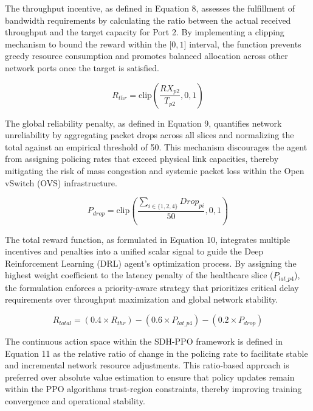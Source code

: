 The throughput incentive, as defined in Equation 8, assesses the fulfillment of bandwidth requirements by calculating the ratio between the actual received throughput and the target capacity for Port 2. By implementing a clipping mechanism to bound the reward within the \(\lbrack 0,1\rbrack\) interval, the function prevents greedy resource consumption and promotes balanced allocation across other network ports once the target is satisfied.

\begin{equation}\label{eq:8}
R_{thr} = \text{clip}\left( \frac{RX_{p2}}{T_{p2}},0,1 \right)
\end{equation}

The global reliability penalty, as defined in Equation 9, quantifies network unreliability by aggregating packet drops across all slices and normalizing the total against an empirical threshold of 50. This mechanism discourages the agent from assigning policing rates that exceed physical link capacities, thereby mitigating the risk of mass congestion and systemic packet loss within the Open vSwitch (OVS) infrastructure.

\begin{equation}\label{eq:9}
P_{drop} = \text{clip}\left( \frac{\sum_{i \in \text{\{}1,2,4\text{\}}}^{}{Drop_{pi}}}{50},0,1 \right)
\end{equation}

The total reward function, as formulated in Equation 10, integrates multiple incentives and penalties into a unified scalar signal to guide the Deep Reinforcement Learning (DRL) agent's optimization process. By assigning the highest weight coefficient to the latency penalty of the healthcare slice (\(P_{lat\text{\_}p4}\)), the formulation enforces a priority-aware strategy that prioritizes critical delay requirements over throughput maximization and global network stability.

\begin{equation}\label{eq:10}
R_{total} = \left( 0.4 \times R_{thr} \right) - \left( 0.6 \times P_{lat\text{\_}p4} \right) - \left( 0.2 \times P_{drop} \right)
\end{equation}

The continuous action space within the SDH-PPO framework is defined in Equation 11 as the relative ratio of change in the policing rate to facilitate stable and incremental network resource adjustments. This ratio-based approach is preferred over absolute value estimation to ensure that policy updates remain within the PPO algorithm\textquotesingle s trust-region constraints, thereby improving training convergence and operational stability.

